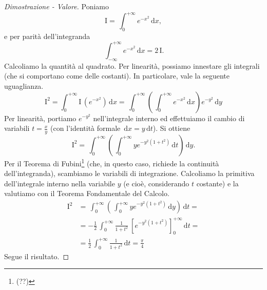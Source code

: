 \begin{proof}[Dimostrazione - Valore]
	Poniamo
	\begin{equation*}
		\mathrm{I} = 
		\, \int_{0}^{+ \infty}e^{-x^2} \, \mathrm{d}x,
	\end{equation*}
	e per parità dell'integranda
	\begin{equation*}
		\, \int_{- \infty}^{+ \infty}e^{-x^2} \, \mathrm{d}x = 
		2 \, \mathrm{I}.
	\end{equation*}
	Calcoliamo la quantità al quadrato. Per linearità, possiamo innestare gli integrali (che si comportano come delle costanti). 
	In particolare, vale la seguente uguaglianza.
	\begin{equation*}
		\mathrm{I}^2 = 
		\int_{0}^{+ \infty} \mathrm{I} \, \left(e^{-x^2} \right) \, \mathrm{d}x=
		\, \int_{0}^{+ \infty} \left( \, \int_{0}^{+ \infty} e^{-x^2} \, \mathrm{d}x \right) e^{-y^2} \, \mathrm{d}y
	\end{equation*}
	Per linearità, portiamo $e^{-y^2}$ nell'integrale interno ed effettuiamo il cambio di variabili $t = \frac{x}{y}$ (con l'identità formale $ \, \mathrm{d}x=y \, \mathrm{d}t$). Si ottiene
	\begin{equation*}
		\mathrm{I}^2 = 
		\, \int_{0}^{+ \infty} \left( \, \int_{0}^{+ \infty} ye^{-y^2(1+t^2)} \, \mathrm{d}t \right) \, \mathrm{d}y.
	\end{equation*}
	Per il Teorema di Fubini\footnote{(??)} (che, in questo caso, richiede la continuità dell'integranda), scambiamo le variabili di integrazione. 
	Calcoliamo la primitiva dell'integrale interno nella variabile $y$ (e cioè, considerando $t$ costante) e la valutiamo con il Teorema Fondamentale del Calcolo.
	\begin{equation*}
		\begin{split}
			\mathrm{I}^2 
			& =
			\, \int_{0}^{+ \infty} \left( \, \int_{0}^{+ \infty} ye^{-y^2(1+t^2)} \, \mathrm{d}y \right) \, \mathrm{d}t= 
			\\ &=
			- \frac{1}{2} \, \int_{0}^{+ \infty} \frac{1}{1+t^2} \ \left[ e^{-y^2(1+t^2)} \right]_{0}^{+ \infty} \, \mathrm{d}t= 
			\\ &= 
			\frac{1}{2} \, \int_{0}^{+ \infty} \frac{1}{1+t^2} \, \mathrm{d}t = \frac{ \pi}{4}
		\end{split}
	\end{equation*}
	Segue il risultato.
\end{proof}
\pagebreak
